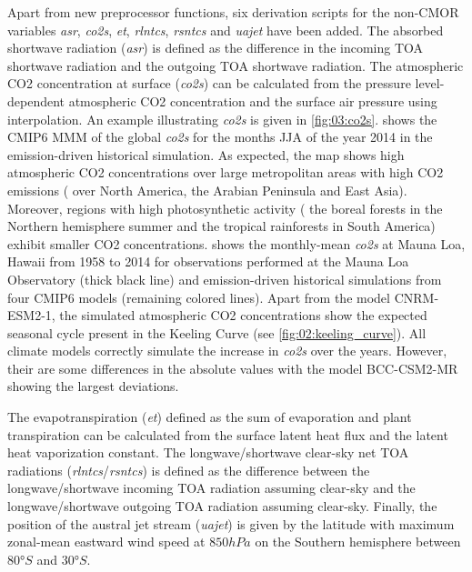 Apart from new preprocessor functions, six derivation scripts for the
non-\ac{CMOR} variables \emph{asr}, \emph{co2s}, \emph{et}, \emph{rlntcs},
\emph{rsntcs} and \emph{uajet} have been added. The absorbed shortwave
radiation (\emph{asr}) is defined as the difference in the incoming \ac{TOA}
shortwave radiation and the outgoing \ac{TOA} shortwave radiation. The
atmospheric \ac{CO2} concentration at surface (\emph{co2s}) can be calculated
from the pressure level-dependent atmospheric \ac{CO2} concentration and the
surface air pressure using interpolation. An example illustrating \emph{co2s}
is given in \cref{fig:03:co2s}.  shows the \acs{CMIP}6
\ac{MMM} of the global \emph{co2s} for the months \acf{JJA} of the year 2014 in
the emission-driven historical simulation. As expected, the map shows high
atmospheric \ac{CO2} concentrations over large metropolitan areas with high
\ac{CO2} emissions (\eg{} over North America, the Arabian Peninsula and East
Asia). Moreover, regions with high photosynthetic activity (\eg{} the boreal
forests in the Northern hemisphere summer and the tropical rainforests in South
America) exhibit smaller \ac{CO2} concentrations.  shows
the monthly-mean \emph{co2s} at Mauna Loa, Hawaii from 1958 to 2014 for
observations performed at the Mauna Loa Observatory \autocite{Keeling2005}
(thick black line) and emission-driven historical simulations from four
\acs{CMIP}6 models (remaining colored lines). Apart from the model CNRM-ESM2-1,
the simulated atmospheric \ac{CO2} concentrations show the expected seasonal
cycle present in the Keeling Curve (see \cref{fig:02:keeling_curve}). All
climate models correctly simulate the increase in \emph{co2s} over the years.
However, their are some differences in the absolute values with the model
BCC-CSM2-MR showing the largest deviations.

The evapotranspiration (\emph{et}) defined as the sum of evaporation and plant
transpiration can be calculated from the surface latent heat flux and the
latent heat vaporization constant. The longwave/shortwave clear-sky net
\acf{TOA} radiations (\emph{rlntcs}/\emph{rsntcs}) is defined as the difference
between the longwave/shortwave incoming \ac{TOA} radiation assuming clear-sky
and the longwave/shortwave outgoing \ac{TOA} radiation assuming clear-sky.
Finally, the position of the austral jet stream (\emph{uajet}) is given by the
latitude with maximum zonal-mean eastward wind speed at $850 \unit{hPa}$ on the
Southern hemisphere between $80 \unit{\degree S}$ and $30 \unit{\degree S}$.


